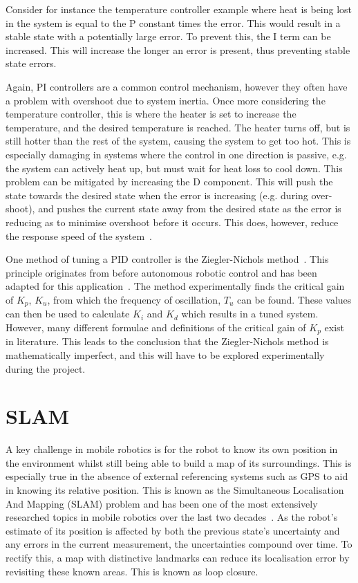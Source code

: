 Consider for instance the temperature controller example where heat is being
lost in the system is equal to the P constant times the error. This would
result in a stable state with a potentially large error. To prevent this,
the I term can be increased. This will increase the longer an error is
present, thus preventing stable state errors.

Again, PI controllers are a common control mechanism, however they often have
a problem with overshoot due to system inertia. Once more considering the
temperature controller, this is where the heater is set to increase the
temperature, and the desired temperature is reached. The heater turns off, but
is still hotter than the rest of the system, causing the system to get too hot.
This is especially damaging in systems where the control in one direction
is passive, e.g. the system can actively heat up, but must wait for heat loss
to cool down. This problem can be mitigated by increasing the D component.
This will push the state towards the desired state when the error is increasing
(e.g. during over-shoot), and pushes the current state away from the desired
state as the error is reducing as to minimise overshoot before it
occurs. This does, however, reduce the response speed of the system~\cite{chen2007linear}.

One method of tuning a PID controller is the Ziegler-Nichols method~\cite{ziegler1942optimum}. This principle originates from before autonomous
robotic control and has been adapted for this application~\cite{aastrom2004revisiting}. The method experimentally finds the critical gain
of $K_p$, $K_u$, from which the frequency of oscillation, $T_u$ can be found.
These values can then be used to calculate $K_i$ and $K_d$ which results in a
tuned system. However, many different formulae and definitions of the critical
gain of $K_p$ exist in literature. This leads to the conclusion that the
Ziegler-Nichols method is mathematically imperfect, and this will have to be
explored experimentally during the project.

\section{SLAM}\label{litreview/slam}
A key challenge in mobile robotics is for the robot to know its own position in the
environment whilst still being able to build a map of its surroundings.
This is especially true in the absence of external referencing systems
such as GPS to aid in knowing its relative position. This is known as the Simultaneous Localisation And Mapping (SLAM)
problem and has been one of the most extensively researched topics in mobile
robotics over the last two decades~\cite{grisetti2010tutorial}. As the robot's
estimate of its position is affected by both the previous state's uncertainty
and any errors in the current measurement, the uncertainties compound
over time. To rectify this, a map with distinctive landmarks can reduce its
localisation error by revisiting these known areas. This is known as loop closure.

